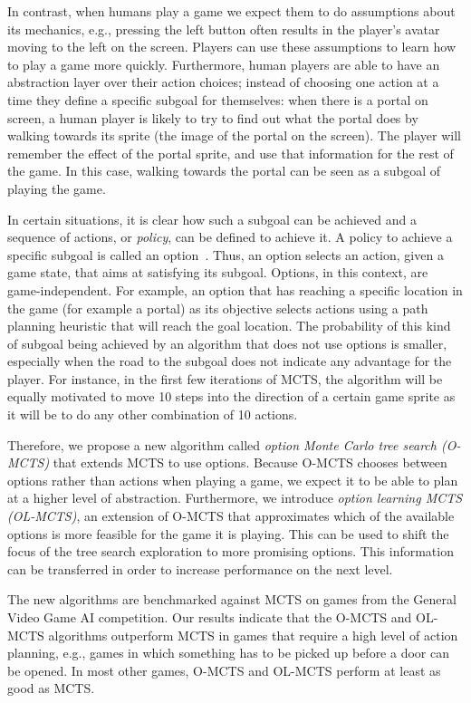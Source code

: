 In contrast, when humans play a game we expect them to do assumptions about its
mechanics, e.g., pressing the left button often results in the player's avatar
moving to the left on the screen. Players can use these assumptions to learn how
to play a game more quickly. Furthermore, human players are able to have an
abstraction layer over their action choices; instead of choosing one action at a
time they define a specific subgoal for themselves: when there is a portal on
screen, a human player is likely to try to find out what the portal does by
walking towards its sprite (the image of the portal on the screen). The player
will remember the effect of the portal sprite, and use that information for the
rest of the game. In this case, walking towards the portal can be seen as a
subgoal of playing the game.

In certain situations, it is clear how such a subgoal can be achieved and a
sequence of actions, or \emph{policy}, can be defined to achieve it. A policy to
achieve a specific subgoal is called an option~\cite{sutton1999between}. Thus,
an option selects an action, given a game state, that aims at satisfying its
subgoal. Options, in this context, are game-independent. For example, an option
that has reaching a specific location in the game (for example a portal) as its
objective selects actions using a path planning heuristic that will reach the
goal location.  The probability of this kind of subgoal being achieved by an
algorithm that does not use options is smaller, especially when the road to the
subgoal does not indicate any advantage for the player. For instance, in the
first few iterations of MCTS, the algorithm will be equally motivated to move 10
steps into the direction of a certain game sprite as it will be to do any other
combination of 10 actions. 

Therefore, we propose a new algorithm called \emph{option Monte Carlo tree
search (O-MCTS)} that extends MCTS to use options. Because O-MCTS chooses
between options rather than actions when playing a game, we expect it to be able
to plan at a higher level of abstraction. Furthermore, we introduce \emph{option
learning MCTS (OL-MCTS)}, an extension of O-MCTS that approximates which of the
available options is more feasible for the game it is playing. This can
be used to shift the focus of the tree search exploration to more promising
options. This information can be transferred in order to increase performance on
the next level.

The new algorithms are benchmarked against MCTS on games from the General Video
Game AI competition. Our results indicate that the O-MCTS and OL-MCTS algorithms
outperform MCTS in games that require a high level of action planning, e.g.,
games in which something has to be picked up before a door can be opened. In
most other games, O-MCTS and OL-MCTS perform at least as good as MCTS\@.
